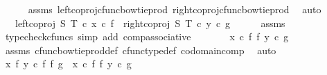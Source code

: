 \begin{isabellebody}
\ \ \ \ \isamarkupfalse%
\ assms{\isacharparenleft}{\kern0pt}{}{\isacharcomma}{\kern0pt}{}{\isacharparenright}{\kern0pt}\ left{\isacharunderscore}{\kern0pt}coproj{\isacharunderscore}{\kern0pt}cfunc{\isacharunderscore}{\kern0pt}bowtie{\isacharunderscore}{\kern0pt}prod\ right{\isacharunderscore}{\kern0pt}coproj{\isacharunderscore}{\kern0pt}cfunc{\isacharunderscore}{\kern0pt}bowtie{\isacharunderscore}{\kern0pt}prod\ \isamarkupfalse%
\ auto\isanewline
\ \ \isamarkupfalse%
\ \isamarkupfalse%
\ {\isachardoublequoteopen}{\isachardot}{\kern0pt}{\isachardot}{\kern0pt}{\isachardot}{\kern0pt}\ {\isacharequal}{\kern0pt}\ {\isacharparenleft}{\kern0pt}left{\isacharunderscore}{\kern0pt}coproj\ S\ T\ {\isasymcirc}\isactrlsub c\ x\ {\isasymcirc}\isactrlsub c\ f{\isacharparenright}{\kern0pt}\ {\isasymamalg}\ {\isacharparenleft}{\kern0pt}right{\isacharunderscore}{\kern0pt}coproj\ S\ T\ {\isasymcirc}\isactrlsub c\ y\ {\isasymcirc}\isactrlsub c\ g{\isacharparenright}{\kern0pt}{\isachardoublequoteclose}\isanewline
\ \ \ \ \isamarkupfalse%
\ assms\ \isamarkupfalse%
\ {\isacharparenleft}{\kern0pt}typecheck{\isacharunderscore}{\kern0pt}cfuncs{\isacharcomma}{\kern0pt}\ simp\ add{\isacharcolon}{\kern0pt}\ comp{\isacharunderscore}{\kern0pt}associative{}{\isacharparenright}{\kern0pt}\isanewline
\ \ \isamarkupfalse%
\ \isamarkupfalse%
\ {\isachardoublequoteopen}{\isachardot}{\kern0pt}{\isachardot}{\kern0pt}{\isachardot}{\kern0pt}\ {\isacharequal}{\kern0pt}\ {\isacharparenleft}{\kern0pt}x\ {\isasymcirc}\isactrlsub c\ f{\isacharparenright}{\kern0pt}\ {\isasymbowtie}\isactrlsub f\ {\isacharparenleft}{\kern0pt}y\ {\isasymcirc}\isactrlsub c\ g{\isacharparenright}{\kern0pt}{\isachardoublequoteclose}\isanewline
\ \ \ \ \isamarkupfalse%
\ assms\ cfunc{\isacharunderscore}{\kern0pt}bowtie{\isacharunderscore}{\kern0pt}prod{\isacharunderscore}{\kern0pt}def\ cfunc{\isacharunderscore}{\kern0pt}type{\isacharunderscore}{\kern0pt}def\ codomain{\isacharunderscore}{\kern0pt}comp\ \isamarkupfalse%
\ auto\isanewline
\ \ \isamarkupfalse%
\ \isamarkupfalse%
\ {\isachardoublequoteopen}{\isacharparenleft}{\kern0pt}x\ {\isasymbowtie}\isactrlsub f\ y{\isacharparenright}{\kern0pt}\ {\isasymcirc}\isactrlsub c\ {\isacharparenleft}{\kern0pt}f\ {\isasymbowtie}\isactrlsub f\ g{\isacharparenright}{\kern0pt}\ {\isacharequal}{\kern0pt}\ {\isacharparenleft}{\kern0pt}x\ {\isasymcirc}\isactrlsub c\ f{\isacharparenright}{\kern0pt}\ {\isasymbowtie}\isactrlsub f\ {\isacharparenleft}{\kern0pt}y\ {\isasymcirc}\isactrlsub c\ g{\isacharparenright}{\kern0pt}{\isachardoublequoteclose}\isanewline

\end{isabellebody}
